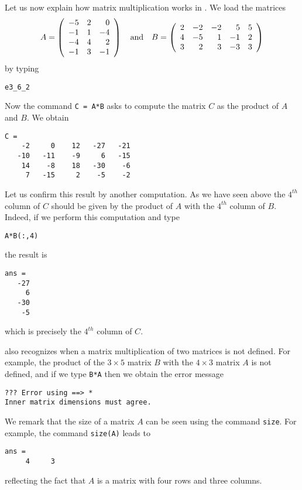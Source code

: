 \documentclass{ximera}
\begin{document}
Let us now explain how matrix multiplication works in \Matlabp.
We load the matrices
\begin{equation*}  \label{examp_AB}
A=\left(\begin{array}{rrr} -5  &  2  &  0\\
               -1  &  1  & -4\\
               -4  &  4  &  2\\
               -1  &  3  & -1 \end{array}\right) \quad\mbox{and}\quad
B =\left(\begin{array}{rrrrr}      2  & -2  & -2  &  5  &  5\\
                    4  & -5  &  1  & -1  &  2\\
                    3  &  2  &  3  & -3  &  3
 \end{array}\right)
\end{equation*}%
by typing
\begin{verbatim}
e3_6_2
\end{verbatim}
Now the command {\tt C = A*B} \index{\computer!*} asks \Matlab to compute
the matrix $C$ as the product of $A$ and $B$.  We obtain
\begin{verbatim}
C =
    -2     0    12   -27   -21
   -10   -11    -9     6   -15
    14    -8    18   -30    -6
     7   -15     2    -5    -2
\end{verbatim}
Let us confirm this result by another computation.  As we have
seen above the $4^{th}$ column of $C$ should be given by the
product of $A$ with the $4^{th}$ column of $B$.  Indeed, if we
perform this computation and type
\begin{verbatim}
A*B(:,4)
\end{verbatim}
the result is
\begin{verbatim}
ans =
   -27
     6
   -30
    -5
\end{verbatim}
which is precisely the $4^{th}$ column of $C$.

\Matlab also recognizes when a matrix multiplication of two
matrices is not defined.  For example, the product of
the $3\times 5$ matrix $B$ with the $4\times 3$ matrix $A$
is not defined, and if we type {\tt B*A} then we obtain the
error message
\begin{verbatim}
??? Error using ==> *
Inner matrix dimensions must agree.
\end{verbatim}
We remark that the size of a matrix $A$ can be seen using
the \Matlab command {\tt size}.
For example, the command {\tt size(A)} leads to
\begin{verbatim}
ans =
     4     3
\end{verbatim}
reflecting the fact that $A$ is a matrix with four
rows and three columns.
\end{document}
